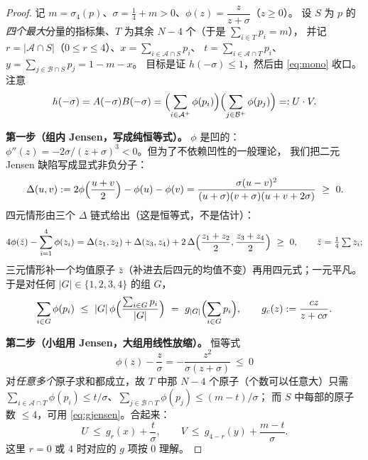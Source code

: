\documentclass[UTF8,11pt]{ctexart}
\theoremstyle{definition}
\begin{document}
\begin{proof}
记 $m=\sigma_4(p)$、$\sigma=\frac14+m>0$、$\phi(z)=\dfrac{z}{z+\sigma}$（$z\ge0$）。
设 $S$ 为 $p$ 的\emph{四个最大}分量的指标集、$T$ 为其余 $N-4$ 个（于是 $\sum_{i\in T}p_i=m$），
并记 $r=|\mathcal A\cap S|$（$0\le r\le4$）、$x=\sum_{i\in\mathcal A\cap S}p_i$、
$t=\sum_{i\in\mathcal A\cap T}p_i$、$y=\sum_{j\in\mathcal B\cap S}p_j=1-m-x$。
目标是证 $h(-\sigma)\le1$，然后由 \eqref{eq:mono} 收口。注意
\begin{equation}\label{eq:hUV}
h(-\sigma)=A(-\sigma)B(-\sigma)=\Bigl(\sum_{i\in\mathcal A^+}\phi(p_i)\Bigr)
\Bigl(\sum_{j\in\mathcal B^+}\phi(p_j)\Bigr)=:U\cdot V .
\end{equation}

\smallskip\noindent\textbf{第一步（组内 Jensen，写成纯恒等式）。}
$\phi$ 是凹的：$\phi''(z)=-2\sigma/(z+\sigma)^3<0$。但为了不依赖凹性的一般理论，
我们把二元 Jensen 缺陷写成显式非负分子：
\begin{equation}\label{eq:Delta}
\Delta(u,v):=2\phi\Bigl(\frac{u+v}{2}\Bigr)-\phi(u)-\phi(v)
=\frac{\sigma(u-v)^2}{(u+\sigma)(v+\sigma)(u+v+2\sigma)}\ \ge\ 0 .
\end{equation}
四元情形由三个 $\Delta$ 链式给出（这是恒等式，不是估计）：
\[
4\phi(\bar z)-\sum_{i=1}^{4}\phi(z_i)=\Delta(z_1,z_2)+\Delta(z_3,z_4)
+2\,\Delta\Bigl(\frac{z_1+z_2}{2},\frac{z_3+z_4}{2}\Bigr)\ \ge\ 0,\qquad \bar z=\tfrac14\textstyle\sum z_i ;
\]
三元情形补一个均值原子 $\bar z$（补进去后四元的均值不变）再用四元式；一元平凡。
于是对任何 $|G|\in\{1,2,3,4\}$ 的组 $G$，
\begin{equation}\label{eq:gjensen}
\sum_{i\in G}\phi(p_i)\ \le\ |G|\,\phi\Bigl(\frac{\sum_{i\in G}p_i}{|G|}\Bigr)
\ =\ g_{|G|}\Bigl(\sum_{i\in G}p_i\Bigr),\qquad g_c(z):=\frac{cz}{z+c\sigma}.
\end{equation}

\smallskip\noindent\textbf{第二步（小组用 Jensen，大组用线性放缩）。}
恒等式
\begin{equation}\label{eq:philin}
\phi(z)-\frac{z}{\sigma}=-\frac{z^2}{\sigma(z+\sigma)}\ \le\ 0
\end{equation}
对\emph{任意多个}原子求和都成立，故 $T$ 中那 $N-4$ 个原子（个数可以任意大）只需
$\sum_{i\in\mathcal A\cap T}\phi(p_i)\le t/\sigma$、$\sum_{j\in\mathcal B\cap T}\phi(p_j)\le(m-t)/\sigma$；
而 $S$ 中每部的原子数 $\le4$，可用 \eqref{eq:gjensen}。合起来：
\begin{equation}\label{eq:UVbound}
U\ \le\ g_r(x)+\frac{t}{\sigma},\qquad V\ \le\ g_{4-r}(y)+\frac{m-t}{\sigma}.
\end{equation}
这里 $r=0$ 或 $4$ 时对应的 $g$ 项按 $0$ 理解。


\end{proof}
\end{document}
